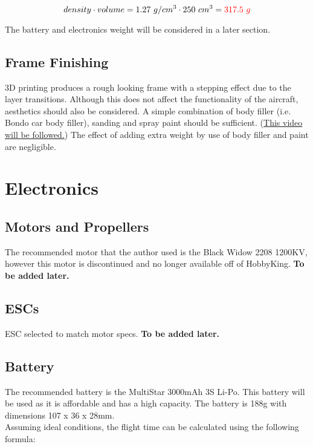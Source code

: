 \documentclass[12pt]{article}
\begin{document}
\begin{equation}
density \cdot volume = 1.27\ g/cm\textsuperscript{3} \cdot 250\ cm\textsuperscript{3} = {\color{red}317.5\ g}
\end{equation}

The battery and electronics weight will be considered in a later section.

\subsection{Frame Finishing}
3D printing produces a rough looking frame with a stepping effect due to the layer transitions. Although this does not affect the functionality of the aircraft, aesthetics should also be considered. A simple combination of body filler (i.e. Bondo car body filler), sanding and spray paint should be sufficient. (\href{https://www.youtube.com/watch?v=NR2RF40Oq6M}{\color{cyan}This video will be followed.}) The effect of adding extra weight by use of body filler and paint are negligible.

\section{Electronics}

\subsection{Motors and Propellers}
The recommended motor that the author used is the Black Widow 2208 1200KV, however this motor is discontinued and no longer available off of HobbyKing. \textbf{To be added later.}

\subsection{ESCs}
ESC selected to match motor specs. \textbf{To be added later.}

\subsection{Battery}
The recommended battery is the MultiStar 3000mAh 3S Li-Po. This battery will be used as it is affordable and has a high capacity. The battery is 188g with dimensions 107 x 36 x 28mm. 
\\

Assuming ideal conditions, the flight time can be calculated using the following formula:
\\
\end{document}
